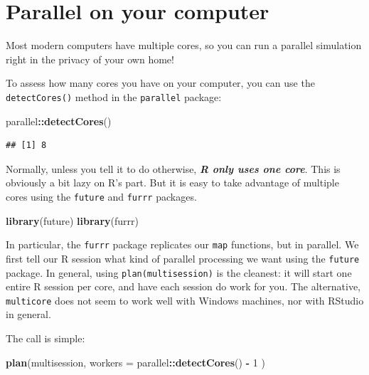 \documentclass[
]{book}
\newenvironment{Shaded}{\begin{snugshade}}{\end{snugshade}}
\newcommand{\AttributeTok}[1]{\textcolor[rgb]{0.13,0.29,0.53}{#1}}
\newcommand{\DecValTok}[1]{\textcolor[rgb]{0.00,0.00,0.81}{#1}}
\newcommand{\FunctionTok}[1]{\textcolor[rgb]{0.13,0.29,0.53}{\textbf{#1}}}
\newcommand{\NormalTok}[1]{#1}
\newcommand{\SpecialCharTok}[1]{\textcolor[rgb]{0.81,0.36,0.00}{\textbf{#1}}}
\begin{document}
\section{Parallel on your computer}\label{parallel-on-your-computer}

Most modern computers have multiple cores, so you can run a parallel simulation right in the privacy of your own home!

To assess how many cores you have on your computer, you can use the \texttt{detectCores()} method in the \texttt{parallel} package:

\begin{Shaded}
\begin{Highlighting}[]
\NormalTok{parallel}\SpecialCharTok{::}\FunctionTok{detectCores}\NormalTok{()}
\end{Highlighting}
\end{Shaded}

\begin{verbatim}
## [1] 8
\end{verbatim}

Normally, unless you tell it to do otherwise, \textbf{\emph{R only uses one core}}.
This is obviously a bit lazy on R's part.
But it is easy to take advantage of multiple cores using the \texttt{future} and \texttt{furrr} packages.

\begin{Shaded}
\begin{Highlighting}[]
\FunctionTok{library}\NormalTok{(future)}
\FunctionTok{library}\NormalTok{(furrr)}
\end{Highlighting}
\end{Shaded}

In particular, the \texttt{furrr} package replicates our \texttt{map} functions, but in parallel.
We first tell our R session what kind of parallel processing we want using the \texttt{future} package.
In general, using \texttt{plan(multisession)} is the cleanest: it will start one entire R session per core, and have each session do work for you.
The alternative, \texttt{multicore} does not seem to work well with Windows machines, nor with RStudio in general.

The call is simple:

\begin{Shaded}
\begin{Highlighting}[]
\FunctionTok{plan}\NormalTok{(multisession, }\AttributeTok{workers =}\NormalTok{ parallel}\SpecialCharTok{::}\FunctionTok{detectCores}\NormalTok{() }\SpecialCharTok{{-}} \DecValTok{1}\NormalTok{ )}
\end{Highlighting}
\end{Shaded}
\end{document}
